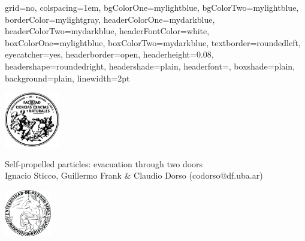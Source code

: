 \documentclass[final]{baposter}
\begin{document}
\begin{poster}{
  grid=no,
  colspacing=1em,
  bgColorOne=mylightblue,                        
  bgColorTwo=mylightblue,                        
  borderColor=mylightgray,
  headerColorOne=mydarkblue,
  headerColorTwo=mydarkblue,
  headerFontColor=white,
  boxColorOne=mylightblue,
  boxColorTwo=mydarkblue,
  textborder=roundedleft,
  eyecatcher=yes,
  headerborder=open,
  headerheight=0.08\textheight,
  headershape=roundedright,
  headershade=plain,
  headerfont=\Large\textsf, %
  boxshade=plain,
  background=plain,
  linewidth=2pt
  }
  {\begin{minipage}{10em}
    \vspace{7mm}
    \hfill
    \includegraphics[height=6.5em]{logo_fcen}
    \vspace{5mm}
  \end{minipage}} %
  {\sf %
  \textcolor{mydarkblue}{Self-propelled particles: evacuation through two doors \\}
\vspace{3mm}
\textcolor{mydarkblue}{\Large Ignacio Sticco, Guillermo Frank  \& 
Claudio Dorso 
{\large(codorso\textcolor{orange!90!black}{@}df.uba.ar)} }}
  {\sf %
  }
  {{\begin{minipage}{7em}
    \vspace{4mm}
    \hfill
    \includegraphics[height=5.5em]{uba3}
  \end{minipage}}
  }


\end{poster}
\end{document}
